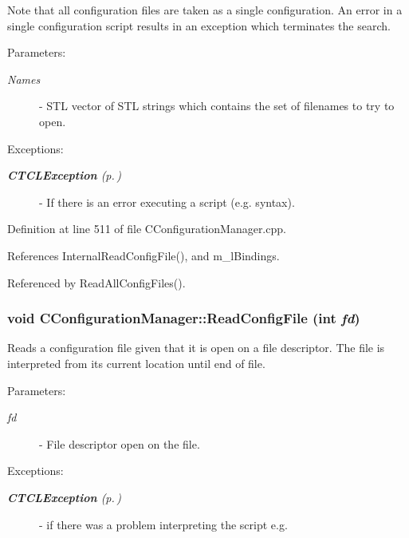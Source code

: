 Note that all configuration files are taken as a single configuration. An error in a single configuration script results in an exception which  terminates the search.\begin{Desc}
\item[Parameters: ]\par
\begin{description}
\item[{\em 
Names}]- STL vector of STL strings which contains the set of  filenames to try to open.\end{description}
\end{Desc}
\begin{Desc}
\item[Exceptions: ]\par
\begin{description}
\item[{\em 
{\bf CTCLException} {\rm (p.\,\pageref{classCTCLException})}}] - If there is an error executing a script (e.g. syntax). \end{description}
\end{Desc}


Definition at line 511 of file CConfiguration\-Manager.cpp.

References Internal\-Read\-Config\-File(), and m\_\-l\-Bindings.

Referenced by Read\-All\-Config\-Files().
\subsubsection{\setlength{\rightskip}{0pt plus 5cm}void CConfiguration\-Manager::Read\-Config\-File (int {\em fd})}\label{classCConfigurationManager_a13}


Reads a configuration file given that it is open on a file descriptor. The file is interpreted from its current location until end of file. \begin{Desc}
\item[Parameters: ]\par
\begin{description}
\item[{\em 
fd}]- File descriptor open on the file.\end{description}
\end{Desc}
\begin{Desc}
\item[Exceptions: ]\par
\begin{description}
\item[{\em 
{\bf CTCLException} {\rm (p.\,\pageref{classCTCLException})}}] - if there was a problem interpreting the script e.g. \end{description}
\end{Desc}


